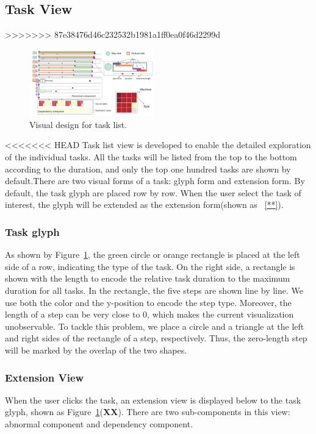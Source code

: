 \subsection{Task View}
>>>>>>> 87e38476d46c232532b1981a1ff0ea0f46d2299d


\begin{figure}[t]
	\centering
	\includegraphics[width=0.48\textwidth]{figures/visualization/taskList.pdf}
	\vspace{-3mm}
	\caption{Visual design for task list.}
	\label{fig:taskList}
	\vspace{-3mm}
\end{figure}

<<<<<<< HEAD
Task list view is developed to enable the detailed exploration of the individual tasks.
All the tasks will be listed from the top to the bottom according to the duration, and only the top one hundred tasks are shown by default.There are two visual forms of a task: glyph form and extension form. By default, the task glyph are placed row by row. When the user select the task of interest, the glyph will be extended as the extension form(shown as ~\ref{**}).


\subsubsection{Task glyph}
As shown by Figure~\ref{fig:taskList}, the green circle or orange rectangle is placed at the left side of a row, indicating the type of the task. On the right side, a rectangle is shown with the length to encode the relative task duration to the maximum duration for all tasks. In the rectangle, the five steps are shown line by line. We use both the color and the y-position to encode the step type. Moreover, the length of a step can be very close to 0, which makes the current visualization unobservable. To tackle this problem, we place a circle and a triangle at the left and right sides of the rectangle of a step, respectively. Thus, the zero-length step will be marked by the overlap of the two shapes.

\subsubsection{Extension View}
When the user clicks the task, an extension view is displayed below to the task glyph, shown as Figure~\ref{fig:taskList}(\textbf{XX}). There are two sub-components in this view: abnormal component and dependency component. 


